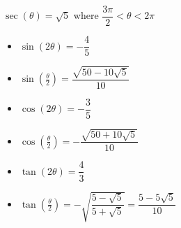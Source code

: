 {$\sec(\theta) = \sqrt{5}$ where $\dfrac{3\pi}{2} < \theta < 2\pi$}
{\begin{itemize}
\item $\sin(2\theta) = -\dfrac{4}{5}$
\item $\sin\left(\frac{\theta}{2}\right) = \dfrac{\sqrt{50-10\sqrt{5}}}{10}$ 
\item $\cos(2\theta) = -\dfrac{3}{5}$
\item $\cos\left(\frac{\theta}{2}\right)= -\dfrac{\sqrt{50+10\sqrt{5}}}{10}$ 
\item $\tan(2\theta)=\dfrac{4}{3}$
\item $\tan\left(\frac{\theta}{2}\right) =  -\sqrt{\dfrac{5-\sqrt{5}}{5+\sqrt{5}}} =\dfrac{5-5\sqrt{5}}{10}$
\end{itemize}
}